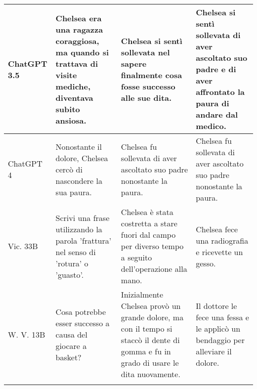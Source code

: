 \begin{table}
\begin{tabularx}{\linewidth}{l|X|X|X}
ChatGPT 3.5 &  Chelsea era una ragazza coraggiosa, ma quando si trattava di visite mediche, diventava subito ansiosa. &  Chelsea si sentì sollevata nel sapere finalmente cosa fosse successo alle sue dita. &  Chelsea si sentì sollevata di aver ascoltato suo padre e di aver affrontato la paura di andare dal medico. \\ \midrule
ChatGPT 4 &  Nonostante il dolore, Chelsea cercò di nascondere la sua paura. &  Chelsea fu sollevata di aver ascoltato suo padre nonostante la paura. &  Chelsea fu sollevata di aver ascoltato suo padre nonostante la paura. \\ \midrule
Vic. 33B &   Scrivi una frase utilizzando la parola 'frattura' nel senso di 'rotura' o 'guasto'. &  Chelsea è stata costretta a stare fuori dal campo per diverso tempo a seguito dell'operazione alla mano. & Chelsea fece una radiografia e ricevette un gesso. \\ \midrule
W. V. 13B &  Cosa potrebbe esser successo a causa del giocare a basket? &  Inizialmente Chelsea provò un grande dolore, ma con il tempo si staccò il dente di gomma e fu in grado di usare le dita nuovamente. & Il dottore le fece una fessa e le applicò un bendaggio per alleviare il dolore. \\

\arrayrulecolor{black}
\bottomrule

\end{tabularx}
\end{table}
